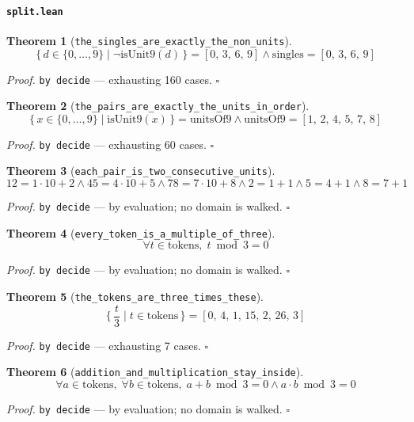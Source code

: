 \documentclass[11pt]{article}
\newtheorem{theorem}{Theorem}[section]
\begin{document}
\paragraph{\texttt{split.lean}}

\begin{theorem}[\texttt{the\_singles\_are\_exactly\_the\_non\_units}]
\[ \{\, d \in \{0,\dots,9\} \mid \lnot \mathrm{isUnit9}\mathopen{}\left(d\right) \,\} = [0,\,3,\,6,\,9] \land \mathrm{singles} = [0,\,3,\,6,\,9] \]
\end{theorem}
\noindent\emph{Proof.} \texttt{by decide} --- exhausting 160 cases. \hfill$\square$

\begin{theorem}[\texttt{the\_pairs\_are\_exactly\_the\_units\_in\_order}]
\[ \{\, x \in \{0,\dots,9\} \mid \mathrm{isUnit9}\mathopen{}\left(x\right) \,\} = \mathrm{unitsOf9} \land \mathrm{unitsOf9} = [1,\,2,\,4,\,5,\,7,\,8] \]
\end{theorem}
\noindent\emph{Proof.} \texttt{by decide} --- exhausting 60 cases. \hfill$\square$

\begin{theorem}[\texttt{each\_pair\_is\_two\_consecutive\_units}]
\[ 12 = 1 \cdot 10 + 2 \land 45 = 4 \cdot 10 + 5 \land 78 = 7 \cdot 10 + 8 \land 2 = 1 + 1 \land 5 = 4 + 1 \land 8 = 7 + 1 \]
\end{theorem}
\noindent\emph{Proof.} \texttt{by decide} --- by evaluation; no domain is walked. \hfill$\square$

\begin{theorem}[\texttt{every\_token\_is\_a\_multiple\_of\_three}]
\[ \forall t \in \mathrm{tokens},\; t \bmod 3 = 0 \]
\end{theorem}
\noindent\emph{Proof.} \texttt{by decide} --- by evaluation; no domain is walked. \hfill$\square$

\begin{theorem}[\texttt{the\_tokens\_are\_three\_times\_these}]
\[ \{\, \frac{t}{3} \mid t \in \mathrm{tokens} \,\} = [0,\,4,\,1,\,15,\,2,\,26,\,3] \]
\end{theorem}
\noindent\emph{Proof.} \texttt{by decide} --- exhausting 7 cases. \hfill$\square$

\begin{theorem}[\texttt{addition\_and\_multiplication\_stay\_inside}]
\[ \forall a \in \mathrm{tokens},\; \forall b \in \mathrm{tokens},\; a + b \bmod 3 = 0 \land a \cdot b \bmod 3 = 0 \]
\end{theorem}
\noindent\emph{Proof.} \texttt{by decide} --- by evaluation; no domain is walked. \hfill$\square$
\end{document}
